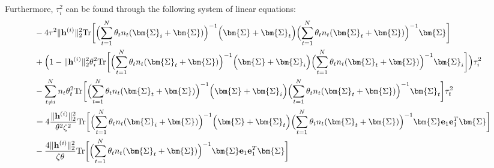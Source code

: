 \documentclass[final]{l4dc2026}
\newcommand{\bSigma}{\bm{\Sigma}}
\newcommand{\be}{\mathbf{e}}
\newcommand{\bh}{\mathbf{h}}
\newcommand{\tr}{\text{Tr}}
\begin{document}
Furthermore, $\tau_i^2$ can be found through the following system of linear equations:
\begin{align}\label{eq: tau_i}
    &-  4 \tau^2 \|\bh^{(i)}\|_2^2  \tr \biggl[\Bigl(\sum_{t=1}^N \theta_t n_t (\bSigma_i + \bSigma) \Bigr)^{-1} \Bigl(\bSigma + \bSigma_t \Bigr)  \Bigl(\sum_{t=1}^N \theta_t n_t (\bSigma_t + \bSigma)\Bigr)^{-1} \bSigma \biggr] \nonumber \\
   &+\Bigl(1- \|\bh^{(i)}\|_2^2 \theta^2_i \tr \biggl[\Bigl(\sum_{t=1}^N \theta_t n_t (\bSigma_t + \bSigma) \Bigr)^{-1} \Bigl(\bSigma + \bSigma_i \Bigr)  \Bigl(\sum_{t=1}^N \theta_t n_t (\bSigma_t + \bSigma)\Bigr)^{-1}  \bSigma_i \biggr]  \Bigr) \tau_i^2 \nonumber \\
   &- \sum_{t\neq i}^N n_t \theta^2_t \tr \biggl[ \Bigl(\sum_{t=1}^N \theta_t n_t (\bSigma_t + \bSigma) \Bigr)^{-1} \Bigl(\bSigma + \bSigma_i \Bigr)  \Bigl(\sum_{t=1}^N \theta_t n_t (\bSigma_t + \bSigma)\Bigr)^{-1}  \bSigma_t \biggr] \tau_t^2  \nonumber \\ 
   &= 4 \frac{\|\bh^{(i)}\|_2^2}{\theta^2\zeta^2}  \tr \biggl[ \Bigl(\sum_{t=1}^N \theta_t n_t (\bSigma_i + \bSigma) \Bigr)^{-1} \Bigl(\bSigma + \bSigma_t \Bigr)  \Bigl(\sum_{t=1}^N \theta_t n_t (\bSigma_t + \bSigma)\Bigr)^{-1} \bSigma \be_1 \be_1^T \bSigma  \biggr]\nonumber  \\ 
   &- \frac{4  \|\bh^{(i)}\|_2^2 }{\zeta \theta} \tr \biggl[\Bigl(\sum_{t=1}^N \theta_t n_t (\bSigma_t + \bSigma) \Bigr)^{-1}  \bSigma \be_1 \be_1^T \bSigma \biggr]
\end{align}
\end{document}
